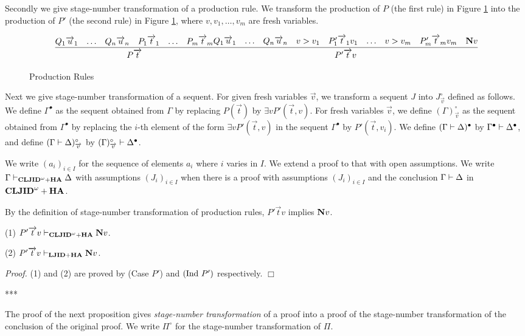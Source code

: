 Secondly 
we give stage-number transformation of a production rule.
We transform the production of $P$ (the first rule) in Figure \ref{fig:2}
into the production of $P'$ (the second rule) in Figure \ref{fig:2},
where $v,v_1,\ldots,v_m$ are fresh variables.
\begin{figure}[t]
{\prooflineskip
\[
\infer{P\Vec t}{Q_1\Vec u_1 & \ldots & Q_n\Vec u_n & P_1\Vec t_1 & \ldots & P_m\Vec t_m}
\\
\infer{P'\Vec tv}{Q_1\Vec u_1 & \ldots & Q_n\Vec u_n & v > v_1 & P'_1\Vec t_1v_1 & \ldots & v > v_m & P'_m\Vec t_mv_m & \N v}
\]
}
\caption{Production Rules}\label{fig:2}
\end{figure}

Next we give stage-number transformation of a sequent.
For given fresh variables $\Vec v$,
we transform a sequent $J$ into $J^\circ_{\Vec v}$ defined as follows.
We define $\Gamma^\bullet$ 
as the sequent obtained from $\Gamma$
by replacing $P(\Vec t)$ by $\exists vP'(\Vec t,v)$.
%
For fresh variables $\Vec v$, 
we define $(\Gamma)^\circ_{\Vec v}$ 
as the sequent obtained from $\Gamma^\bullet$
by replacing the $i$-th element 
of the form $\exists vP'(\Vec t,v)$ in the sequent $\Gamma^\bullet$
by $P'(\Vec t,v_i)$.
%
We define $(\Gamma \mathrel \vdash \Delta)^\bullet$ by $\Gamma^\bullet \mathrel \vdash \Delta^\bullet$,
and define $(\Gamma \mathrel \vdash \Delta)^\circ_{\overrightarrow v}$ by $(\Gamma)^\circ_{\overrightarrow v} \mathrel \vdash \Delta^\bullet$.

We write $(a_i)_{i \in I}$ for the sequence of elements $a_i$ 
where $i$ varies in $I$.
We extend a proof to that with open assumptions.
We write $\Gamma \mathrel \vdash_{{\bf CLJID}^\omega+{\bf HA}} \Delta$ with assumptions $(J_i)_{i \in I}$
when there is a proof with assumptions $(J_i)_{i \in I}$ and
the conclusion $\Gamma \mathrel \vdash \Delta$ in ${{\bf CLJID}^\omega+{\bf HA}}$.

By the definition of stage-number transformation of production rules,
$P'\Vec tv$ implies ${\bf N} v$.
\begin{Lemma}
(1) $P'\overrightarrow tv \mathrel \vdash_{{\bf CLJID}^\omega+{\bf HA}} {\bf N} v$.

(2) $P'\overrightarrow tv \mathrel \vdash_{{\bf LJID}+{\bf HA}} {\bf N} v$.
\end{Lemma}
{\em Proof.}
(1) and (2) are proved by (Case $P'$) and $({\rm Ind}\ P')$ respectively.
$\Box$

***

The proof of the next proposition gives 
{\em stage-number transformation}
of a proof into
a proof of the stage-number transformation of the conclusion of the original proof.
We write $\Pi^\circ$ for the stage-number transformation of $\Pi$.

